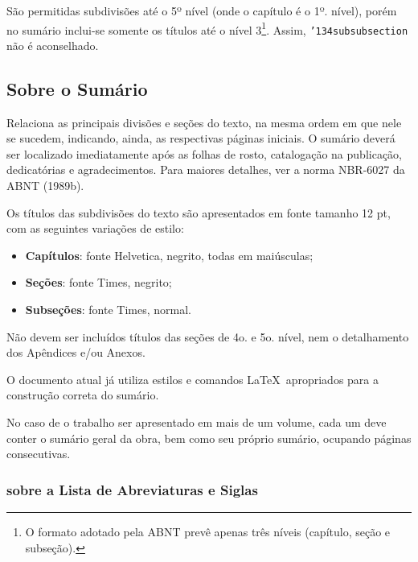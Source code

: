 \documentclass[rel_mlp]{iiufrgs}
\begin{document}
São permitidas subdivisões até o 5º nível (onde o capítulo é o 1º. nível), porém no sumário inclui-se somente os títulos até o nível 3\footnote{O formato adotado pela ABNT prevê apenas três níveis (capítulo, seção e subseção).}. Assim, \texttt{\char'134subsubsection} não é aconselhado. 


\subsection{Sobre o Sumário}

Relaciona as principais divisões e seções do texto, na mesma ordem em que nele se sucedem, indicando, ainda, as respectivas páginas iniciais. O sumário deverá ser localizado imediatamente após as folhas de rosto, catalogação na publicação, dedicatórias e agradecimentos. Para maiores detalhes, ver a norma NBR-6027 da ABNT (1989b). 


Os títulos das subdivisões do texto são apresentados em fonte tamanho 12 pt, com as seguintes variações de estilo: 

\begin{itemize}[leftmargin=3em] %

\setlength{\itemindent}{1em}

    \item \textbf{Capítulos}: fonte Helvetica, negrito, todas em maiúsculas;

    \item \textbf{Seções}: fonte Times, negrito;

    \item \textbf{Subseções}: fonte Times, normal. 

\end{itemize}

Não devem ser incluídos títulos das seções de 4o. e 5o. nível, nem o detalhamento dos Apêndices e/ou Anexos. 

O documento atual já utiliza estilos e comandos \LaTeX\ apropriados para a construção correta do sumário. 

No caso de o trabalho ser apresentado em mais de um volume, cada um deve conter o sumário geral da obra, bem como seu próprio sumário, ocupando páginas consecutivas. 



\subsubsection{sobre a Lista de Abreviaturas e Siglas}
\end{document}
